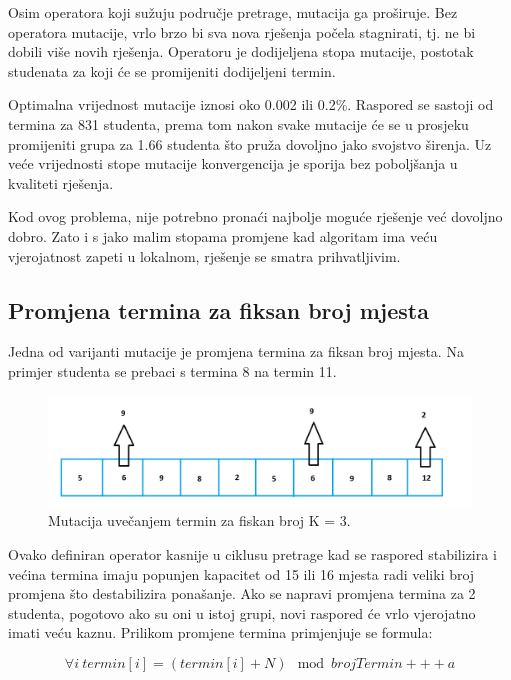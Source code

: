 \documentclass[times, utf8, zavrsni]{fer}
\begin{document}
Osim operatora koji sužuju područje pretrage, mutacija ga proširuje. Bez operatora mutacije, vrlo brzo bi sva nova rješenja počela stagnirati, tj. ne bi dobili više novih rješenja. Operatoru je dodijeljena stopa mutacije, postotak studenata za koji će se promijeniti dodijeljeni termin.

Optimalna vrijednost mutacije  iznosi oko 0.002 ili 0.2\%. Raspored se sastoji od termina za 831 studenta, prema tom nakon svake mutacije će se u prosjeku promijeniti grupa za 1.66 studenta što pruža dovoljno jako svojstvo širenja. Uz veće vrijednosti stope mutacije konvergencija je sporija bez poboljšanja u kvaliteti rješenja.

Kod ovog problema, nije potrebno pronaći najbolje moguće rješenje već dovoljno dobro. Zato i s jako malim stopama promjene kad algoritam ima veću vjerojatnost zapeti u lokalnom, rješenje se smatra prihvatljivim.

\subsection{Promjena termina za fiksan broj mjesta}

Jedna od varijanti mutacije je promjena termina za fiksan broj mjesta. Na primjer studenta se prebaci s termina 8 na termin 11.

\begin{figure}[htb]
\centering
\includegraphics[width=15cm]{images/mut_3.png}
\caption{Mutacija uvečanjem termin za fiskan broj K = 3.}
\label{fig:mut_3}
\end{figure}

Ovako definiran operator kasnije u ciklusu pretrage kad se raspored stabilizira i većina termina imaju popunjen kapacitet od 15 ili 16 mjesta radi veliki broj promjena što destabilizira ponašanje. Ako se napravi promjena termina za 2 studenta, pogotovo ako su oni u istoj grupi, novi raspored će vrlo vjerojatno imati veću kaznu. Prilikom promjene termina primjenjuje se formula:

\begin{equation}
\forall i\ termin[i] = (termin[i] + N)\mod brojTermin+++a
\label{eq:trans-kazne}
\end{equation}
\end{document}
